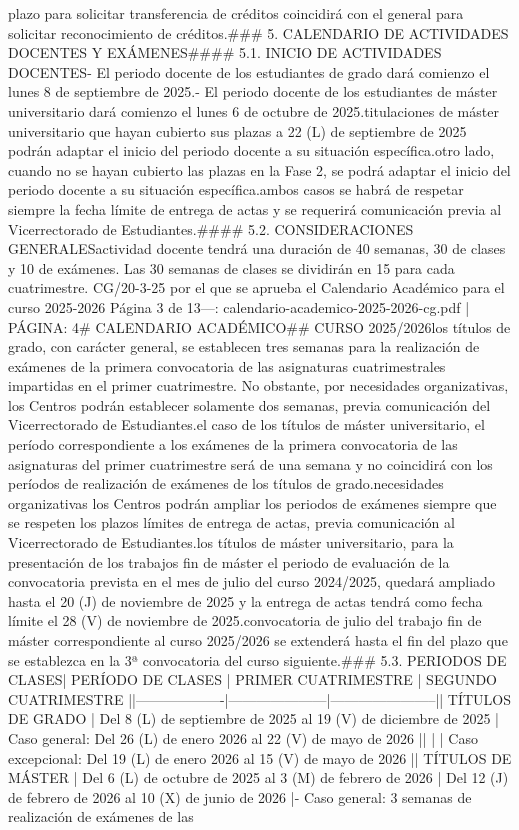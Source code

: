 \documentclass{article}
\begin{document}
\begin{itemize}
plazo para solicitar transferencia de créditos coincidirá con el general para solicitar reconocimiento de créditos.\n\n### 5. CALENDARIO DE ACTIVIDADES DOCENTES Y EXÁMENES\n\n#### 5.1. INICIO DE ACTIVIDADES DOCENTES\n\n- El periodo docente de los estudiantes de grado dará comienzo el lunes 8 de septiembre de 2025.\n- El periodo docente de los estudiantes de máster universitario dará comienzo el lunes 6 de octubre de 2025.\n\nAquellas titulaciones de máster universitario que hayan cubierto sus plazas a 22 (L) de septiembre de 2025 podrán adaptar el inicio del periodo docente a su situación específica.\n\nPor otro lado, cuando no se hayan cubierto las plazas en la Fase 2, se podrá adaptar el inicio del periodo docente a su situación específica.\n\nEn ambos casos se habrá de respetar siempre la fecha límite de entrega de actas y se requerirá comunicación previa al Vicerrectorado de Estudiantes.\n\n#### 5.2. CONSIDERACIONES GENERALES\n\nLa actividad docente tendrá una duración de 40 semanas, 30 de clases y 10 de exámenes. Las 30 semanas de clases se dividirán en 15 para cada cuatrimestre.\n{} CG/20-3-25 por el que se aprueba el Calendario Académico para el curso 2025-2026  Página 3 de 13\n\n---\n\nFUENTE: calendario-academico-2025-2026-cg.pdf | PÁGINA: 4\n# CALENDARIO ACADÉMICO\n## CURSO 2025/2026\n\nEn los títulos de grado, con carácter general, se establecen tres semanas para la realización de exámenes de la primera convocatoria de las asignaturas cuatrimestrales impartidas en el primer cuatrimestre. No obstante, por necesidades organizativas, los Centros podrán establecer solamente dos semanas, previa comunicación del Vicerrectorado de Estudiantes.\n\nPara el caso de los títulos de máster universitario, el período correspondiente a los exámenes de la primera convocatoria de las asignaturas del primer cuatrimestre será de una semana y no coincidirá con los períodos de realización de exámenes de los títulos de grado.\n\nPor necesidades organizativas los Centros podrán ampliar los periodos de exámenes siempre que se respeten los plazos límites de entrega de actas, previa comunicación al Vicerrectorado de Estudiantes.\n\nEn los títulos de máster universitario, para la presentación de los trabajos fin de máster el periodo de evaluación de la convocatoria prevista en el mes de julio del curso 2024/2025, quedará ampliado hasta el 20 (J) de noviembre de 2025 y la entrega de actas tendrá como fecha límite el 28 (V) de noviembre de 2025.\n\nLa convocatoria de julio del trabajo fin de máster correspondiente al curso 2025/2026 se extenderá hasta el fin del plazo que se establezca en la 3ª convocatoria del curso siguiente.\n\n### 5.3. PERIODOS DE CLASES\n\n| PERÍODO DE CLASES | PRIMER CUATRIMESTRE | SEGUNDO CUATRIMESTRE |\n|-------------------|---------------------|-----------------------|\n| TÍTULOS DE GRADO  | Del 8 (L) de septiembre de 2025 al 19 (V) de diciembre de 2025 | Caso general: Del 26 (L) de enero 2026 al 22 (V) de mayo de 2026 |\n|                   |                     | Caso excepcional: Del 19 (L) de enero 2026 al 15 (V) de mayo de 2026 |\n| TÍTULOS DE MÁSTER | Del 6 (L) de octubre de 2025 al 3 (M) de febrero de 2026 | Del 12 (J) de febrero de 2026 al 10 (X) de junio de 2026 |\n\n- Caso general: 3 semanas de realización de exámenes de las 
\end{itemize}
\end{document}
